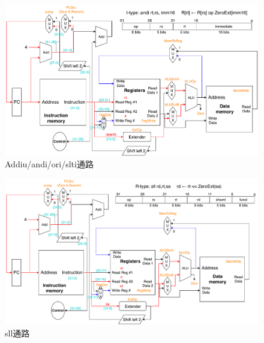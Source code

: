 \begin{figure}[htbp]
\centering
\includegraphics[width=\linewidth]{fig/Datapath_addi.pdf}
\caption{Addiu/andi/ori/slti通路}
\label{fig:datapath_addi}
\end{figure}
\begin{figure}[htbp]
\centering
\includegraphics[width=\linewidth]{fig/Datapath_sll.pdf}
\caption{sll通路}
\label{fig:datapath_sll}
\end{figure}

